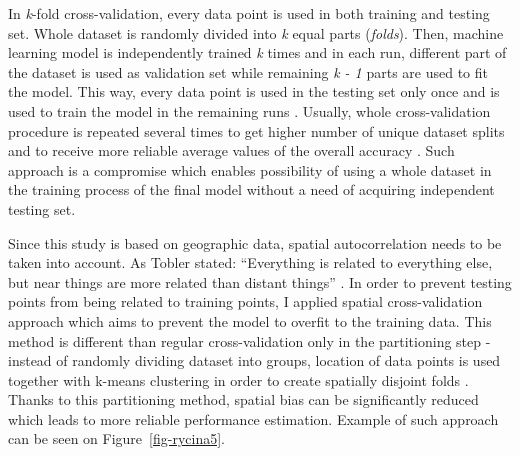 \documentclass{amuthesis}
\begin{document}
In \emph{k}-fold cross-validation, every data point is used in both
training and testing set. Whole dataset is randomly divided into
\emph{k} equal parts (\emph{folds}). Then, machine learning model is
independently trained \emph{k} times and in each run, different part of
the dataset is used as validation set while remaining \emph{k - 1} parts
are used to fit the model. This way, every data point is used in the
testing set only once and is used to train the model in the remaining
runs \autocite{jiao_performance_2016}. Usually, whole cross-validation
procedure is repeated several times to get higher number of unique
dataset splits and to receive more reliable average values of the
overall accuracy \autocite{varga_validation_2021}. Such approach is a
compromise which enables possibility of using a whole dataset in the
training process of the final model without a need of acquiring
independent testing set.

Since this study is based on geographic data, spatial autocorrelation
needs to be taken into account. As Tobler stated: ``Everything is
related to everything else, but near things are more related than
distant things'' \autocite{tobler_computer_1970}. In order to prevent
testing points from being related to training points, I applied spatial
cross-validation approach which aims to prevent the model to overfit to
the training data. This method is different than regular
cross-validation only in the partitioning step - instead of randomly
dividing dataset into groups, location of data points is used together
with k-means clustering \autocite{brenning_spatial_2012} in order to
create spatially disjoint folds \autocite{lovelace_geocomputation_2019}.
Thanks to this partitioning method, spatial bias can be significantly
reduced which leads to more reliable performance estimation. Example of
such approach can be seen on Figure~\ref{fig-rycina5}.
\end{document}
